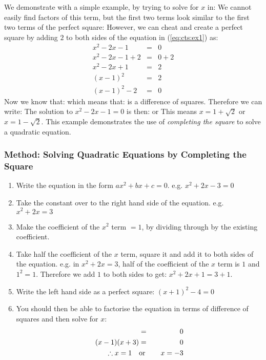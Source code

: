 We demonstrate with a simple example, by trying to solve for $x$ in:
We cannot easily find factors of this term, but the first two terms look similar to the first two terms of the perfect square:
However, we can cheat and create a perfect square by adding $2$ to both sides of the equation in (\ref{eq:cts:ex1}) as:
\begin{eqnarray*}
x^2-2x-1&=&0\\
x^2-2x-1+2&=&0+2\\
x^2-2x+1&=&2\\
(x-1)^2&=&2\\
(x-1)^2-2&=&0
\end{eqnarray*}
Now we know that:
which means that:
is a difference of squares.
Therefore we can write:
The solution to $x^2-2x-1=0$ is then:
or
This means $x=1+\sqrt{2}$ or $x=1-\sqrt{2}$. This example demonstrates the use of \textit{completing the square} to solve a quadratic equation.

\subsubsection{Method: Solving Quadratic Equations by Completing the Square}
\begin{enumerate}
\item{Write the equation in the form $ax^2+bx+c=0$. e.g. $x^2+2x-3=0$}
\item{Take the constant over to the right hand side of the equation. e.g. $x^2+2x=3$}
\item{Make the coefficient of the $x^2$ term $= 1$, by dividing through by the existing coefficient.}
\item{Take half the coefficient of the $x$ term, square it and add it to both sides of the equation. e.g. in $x^2+2x=3$, half of the coefficient of the $x$ term is $1$ and $1^2=1$. Therefore we add $1$ to both sides to get: $x^2+2x+1=3+1$.}
\item{Write the left hand side as a perfect square: $(x+1)^2-4=0$}
\item{You should then be able to factorise the equation in terms of difference of squares and then solve for $x$:\\
\begin{eqnarray*}
[(x+1)-2][(x+1)+2)]&=&0\\
(x-1)(x+3)&=&0\\
\therefore x=1 \quad &\rm{or}& \quad x=-3
\end{eqnarray*}
}
\end{enumerate}

